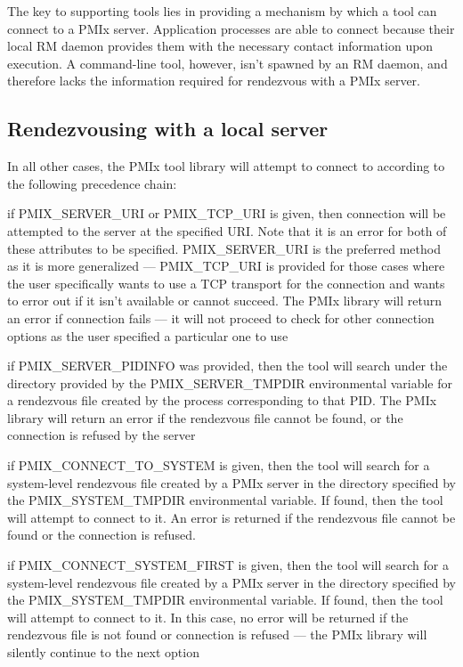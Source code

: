 The key to supporting tools lies in providing a mechanism by which a tool can connect to a \ac{PMIx} server. Application processes are able to connect because their local \ac{RM} daemon provides them with the necessary contact information upon execution. A command-line tool, however, isn't spawned by an \ac{RM} daemon, and therefore lacks the information required for rendezvous with a \ac{PMIx} server.

\subsection{Rendezvousing with a local server}

In all other cases, the PMIx tool library will attempt to connect to according to the following precedence chain:

if PMIX_SERVER_URI or PMIX_TCP_URI is given, then connection will be attempted to the server at the specified URI. Note that it is an error for both of these attributes to be specified. PMIX_SERVER_URI is the preferred method as it is more generalized — PMIX_TCP_URI is provided for those cases where the user specifically wants to use a TCP transport for the connection and wants to error out if it isn’t available or cannot succeed. The PMIx library will return an error if connection fails — it will not proceed to check for other connection options as the user specified a particular one to use

if PMIX_SERVER_PIDINFO was provided, then the tool will search under the directory provided by the PMIX_SERVER_TMPDIR environmental variable for a rendezvous file created by the process corresponding to that PID. The PMIx library will return an error if the rendezvous file cannot be found, or the connection is refused by the server

if PMIX_CONNECT_TO_SYSTEM is given, then the tool will search for a system-level rendezvous file created by a PMIx server in the directory specified by the PMIX_SYSTEM_TMPDIR environmental variable. If found, then the tool will attempt to connect to it. An error is returned if the rendezvous file cannot be found or the connection is refused.

if PMIX_CONNECT_SYSTEM_FIRST is given, then the tool will search for a system-level rendezvous file created by a PMIx server in the directory specified by the PMIX_SYSTEM_TMPDIR environmental variable. If found, then the tool will attempt to connect to it. In this case, no error will be returned if the rendezvous file is not found or connection is refused — the PMIx library will silently continue to the next option

